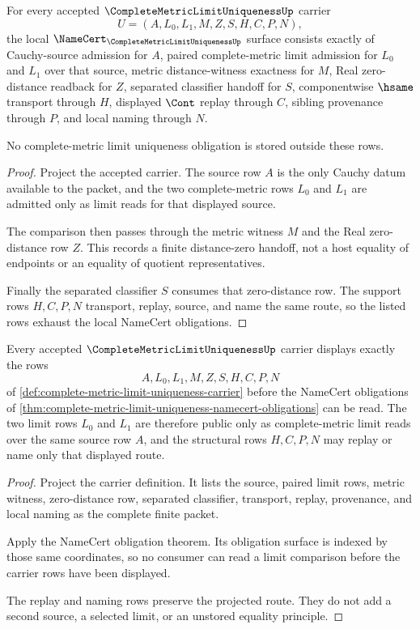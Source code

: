 \begin{theorem}
\label{thm:complete-metric-limit-uniqueness-namecert-obligations}
For every accepted $\CompleteMetricLimitUniquenessUp$ carrier
$$
U=(A,L_{0},L_{1},M,Z,S,H,C,P,N),
$$
the local $\NameCert_{\CompleteMetricLimitUniquenessUp}$ surface consists exactly of Cauchy-source admission for $A$, paired complete-metric limit admission for $L_{0}$ and $L_{1}$ over that source, metric distance-witness exactness for $M$, Real zero-distance readback for $Z$, separated classifier handoff for $S$, componentwise $\hsame$ transport through $H$, displayed $\Cont$ replay through $C$, sibling provenance through $P$, and local naming through $N$.

No complete-metric limit uniqueness obligation is stored outside these rows.
\end{theorem}
\begin{proof}
Project the accepted carrier. The source row $A$ is the only Cauchy datum available to the packet, and the two complete-metric rows $L_{0}$ and $L_{1}$ are admitted only as limit reads for that displayed source.

The comparison then passes through the metric witness $M$ and the Real zero-distance row $Z$. This records a finite distance-zero handoff, not a host equality of endpoints or an equality of quotient representatives.

Finally the separated classifier $S$ consumes that zero-distance row. The support rows $H,C,P,N$ transport, replay, source, and name the same route, so the listed rows exhaust the local NameCert obligations.
\end{proof}

\begin{theorem}
\label{thm:complete-metric-limit-uniqueness-carrier-rows}
Every accepted $\CompleteMetricLimitUniquenessUp$ carrier displays exactly the rows
$$
A,L_{0},L_{1},M,Z,S,H,C,P,N
$$
of \autoref{def:complete-metric-limit-uniqueness-carrier} before the NameCert obligations of \autoref{thm:complete-metric-limit-uniqueness-namecert-obligations} can be read. The two limit rows $L_{0}$ and $L_{1}$ are therefore public only as complete-metric limit reads over the same source row $A$, and the structural rows $H,C,P,N$ may replay or name only that displayed route.
\end{theorem}
\begin{proof}
Project the carrier definition. It lists the source, paired limit rows, metric witness, zero-distance row, separated classifier, transport, replay, provenance, and local naming as the complete finite packet.

Apply the NameCert obligation theorem. Its obligation surface is indexed by those same coordinates, so no consumer can read a limit comparison before the carrier rows have been displayed.

The replay and naming rows preserve the projected route. They do not add a second source, a selected limit, or an unstored equality principle.
\end{proof}

